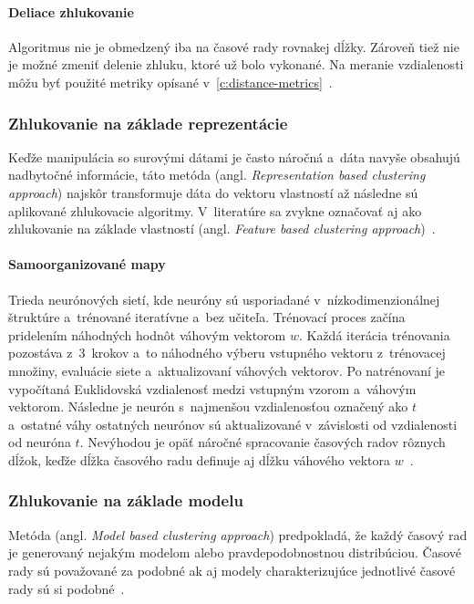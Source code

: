 \documentclass[a4paper,twoside,slovak,12pt,appendix]{article}
\begin{document}
\paragraph{Deliace zhlukovanie}
Algoritmus nie je obmedzený iba na časové rady rovnakej dĺžky. Zároveň tiež nie
je možné zmeniť delenie zhluku, ktoré už bolo vykonané. Na meranie vzdialenosti
môžu byť použité metriky opísané
v~\ref{c:distance-metrics}~\cite{WarrenLiao2005}.


\subsubsection{Zhlukovanie na základe reprezentácie}
Keďže manipulácia so surovými dátami je často náročná a~dáta navyše obsahujú
nadbytočné informácie, táto metóda (angl. \textit{Representation based
clustering approach}) najskôr transformuje dáta do vektoru vlastností až
následne sú aplikované zhlukovacie algoritmy. V~literatúre sa zvykne označovať
aj ako zhlukovanie na základe vlastností (angl. \textit{Feature based clustering
approach})~\cite{Rani2012}.

\paragraph{Samoorganizované mapy}
Trieda neurónových sietí, kde neuróny sú usporiadané v~nízkodimenzionálnej
štruktúre a~trénované iteratívne a~bez učiteľa. Trénovací proces začína
pridelením náhodných hodnôt váhovým vektorom $w$. Každá iterácia trénovania
pozostáva z~3~krokov a~to náhodného výberu vstupného vektoru z~trénovacej
množiny, evaluácie siete a~aktualizovaní váhových vektorov. Po natrénovaní je
vypočítaná Euklidovská vzdialenosť medzi vstupným vzorom a~váhovým vektorom.
Následne je neurón s~najmenšou vzdialenosťou označený ako $t$ a~ostatné váhy
ostatných neurónov sú aktualizované v~závislosti od vzdialenosti od neuróna $t$.
Nevýhodou je opäť náročné spracovanie časových radov rôznych dĺžok, keďže dĺžka
časového radu definuje aj dĺžku váhového vektora
$w$~\cite{Kohonen2001,WarrenLiao2005}.

\subsubsection{Zhlukovanie na základe modelu}
Metóda (angl. \textit{Model based clustering approach}) predpokladá, že každý
časový rad je generovaný nejakým modelom alebo pravdepodobnostnou distribúciou.
Časové rady sú považované za podobné ak aj modely charakterizujúce jednotlivé
časové rady sú si podobné~\cite{Rani2012}.
\end{document}
